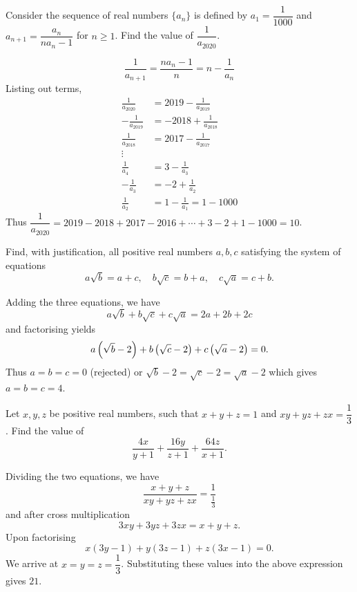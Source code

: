 \begin{prbm}
Consider the sequence of real numbers $\{a_n\}$ is defined by $a_1=\dfrac{1}{1000}$ and $a_{n+1}=\dfrac{a_n}{na_n-1}$ for $n\ge 1$. Find the value of $\dfrac{1}{a_{2020}}$.
\end{prbm}

\begin{solution}
\[ \frac{1}{a_{n+1}}=\frac{na_n-1}{n}=n-\frac{1}{a_n} \]
Listing out terms,
\begin{align*}
\frac{1}{a_{2020}} &= 2019 - \frac{1}{a_{2019}} \\
-\frac{1}{a_{2019}} &= -2018+\frac{1}{a_{2018}} \\
\frac{1}{a_{2018}} &= 2017 - \frac{1}{a_{2017}} \\
\vdots& \\
\frac{1}{a_4} &= 3 - \frac{1}{a_3} \\
-\frac{1}{a_3} &= -2+\frac{1}{a_2} \\
\frac{1}{a_2} &= 1-\frac{1}{a_1}=1-1000
\end{align*}
Thus $\dfrac{1}{a_{2020}}=2019-2018+2017-2016+\cdots+3-2+1-1000=\boxed{10}$.
\end{solution}
\pagebreak

\begin{prbm}
Find, with justification, all positive real numbers $a,b,c$ satisfying the system of equations
\[ a\sqrt{b}=a+c, \quad b\sqrt{c}=b+a, \quad c\sqrt{a}=c+b. \]
\end{prbm}

\begin{solution}
Adding the three equations, we have
\[ a\sqrt{b}+b\sqrt{c}+c\sqrt{a}=2a+2b+2c \]
and factorising yields
\[ a\left(\sqrt{b}-2\right)+b\left(\sqrt{c}-2\right)+c\left(\sqrt{a}-2\right)=0. \]
Thus $a=b=c=0$ (rejected) or $\sqrt{b}-2=\sqrt{c}-2=\sqrt{a}-2$ which gives $\boxed{a=b=c=4}$.
\end{solution}

\begin{prbm}
Let $x,y,z$ be positive real numbers, such that $x+y+z=1$ and $xy+yz+zx=\dfrac{1}{3}$. Find the value of 
\[ \frac{4x}{y+1}+\frac{16y}{z+1}+\frac{64z}{x+1}. \]
\end{prbm}

\begin{solution}
Dividing the two equations, we have
\[ \frac{x+y+z}{xy+yz+zx}=\frac{1}{\frac{1}{3}} \]
and after cross multiplication 
\[ 3xy+3yz+3zx=x+y+z. \]
Upon factorising
\[ x(3y-1)+y(3z-1)+z(3x-1)=0. \]
We arrive at $x=y=z=\dfrac{1}{3}$. Substituting these values into the above expression gives $\boxed{21}$.
\end{solution}

